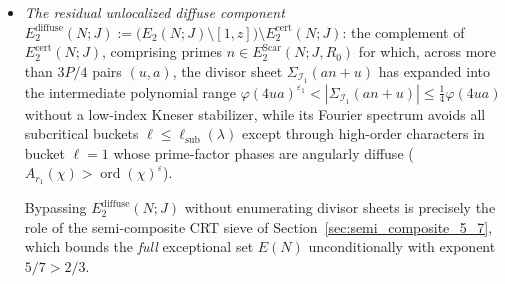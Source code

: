 \documentclass[11pt, a4paper]{article}
\theoremstyle{plain}
\theoremstyle{definition}
\begin{document}
\begin{itemize}
    Theorem~\ref{thm:final_synthesis_and_high_prime_reduction}(a) bounds the entire certified hierarchy $E_2^{\mathrm{cert}}(N;J)$ unconditionally by $\ll N\exp(-c(\lambda)(\log N)^{2\lambda}\log\log N)$ for all $\lambda\in(1/3,1/2)$.
    
    \item \emph{The residual unlocalized diffuse component $E_2^{\mathrm{diffuse}}(N;J):=\allowbreak\big(E_2(N;J)\setminus[1,z]\big)\setminus\allowbreak E_2^{\mathrm{cert}}(N;J)$}: 
    the complement of $E_2^{\mathrm{cert}}(N;J)$, comprising primes $n\in E_2^{\mathrm{Scar}}(N;J,R_0)$ for which, across more than $3P/4$ pairs $(u,a)$, the divisor sheet $\Sigma_{\mathcal{I}_1}(an+u)$ has expanded into the intermediate polynomial range $\varphi(4ua)^{\varepsilon_1}<\allowbreak|\Sigma_{\mathcal{I}_1}(an+u)|\le\allowbreak\frac14\varphi(4ua)$ without a low-index Kneser stabilizer, while its Fourier spectrum avoids all subcritical buckets $\ell\le\ell_{\mathrm{sub}}(\lambda)$ except through high-order characters in bucket $\ell=1$ whose prime-factor phases are angularly diffuse ($A_{r_1}(\chi)>\allowbreak\operatorname{ord}(\chi)^{\varepsilon}$). 
    
    Bypassing $E_2^{\mathrm{diffuse}}(N;J)$ without enumerating divisor sheets is precisely the role of the semi-composite CRT sieve of Section~\ref{sec:semi_composite_5_7}, which bounds the \emph{full} exceptional set $E(N)$ unconditionally with exponent $5/7>2/3$.
\end{itemize}
\end{document}
